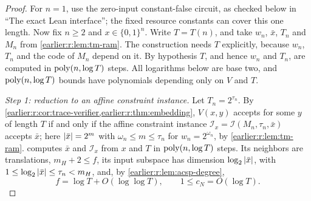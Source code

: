 \begin{proof}
For \(n=1\), use the zero-input constant-false circuit, as checked
below in ``The exact Lean interface''; the fixed resource constants
can cover this one length. Now fix \(n\ge2\) and
\(x\in\{0,1\}^n\). Write \(T=T(n)\), and take \(w_n\),
\(\bar x\), \(T_n\) and \(M_n\) from \cref{earlier:r:lem:tm-ram}. The construction
needs \(T\) explicitly, because \(w_n\), \(T_n\) and the code of \(M_n\)
depend on it. By hypothesis \(T\), and hence \(w_n\) and \(T_n\), are
computed in \(\operatorname{poly}(n,\log T)\) steps. All logarithms below are base two, and
\(\operatorname{poly}(n,\log T)\) bounds have polynomials depending only on \(V\) and
\(T\).

\emph{Step 1: reduction to an affine constraint instance.} Let
\(T_n=2^{\tau_n}\). By \cref{earlier:r:cor:trace-verifier,earlier:r:thm:embedding},
\(V(x,y)\) accepts for some \(y\) of length \(T\) if and only if the
affine constraint instance \(\mathcal I_x=\mathcal I(M_n,\tau_n,\bar x)\)
accepts \(\bar x\); here \(\left|\bar x\right|=2^m\) with
\(\omega_n\le m\le\tau_n\) for \(w_n=2^{\omega_n}\), by
\cref{earlier:r:lem:tm-ram}.  computes \(\bar x\) and
\(\mathcal I_x\) from \(x\) and \(T\) in \(\operatorname{poly}(n,\log T)\) steps. Its
neighbors are translations, \(m_H+2\le f\), its input subspace has
dimension \(\log_2\left|\bar x\right|\), with \(1\le\log_2\left|\bar x\right|\le\tau_n<m_H\),
and, by \cref{earlier:r:lem:acsp-degree},
\[
 f=\log T+O(\log\log T),\qquad 1\le c_N=O(\log T).
\]


\end{proof}
